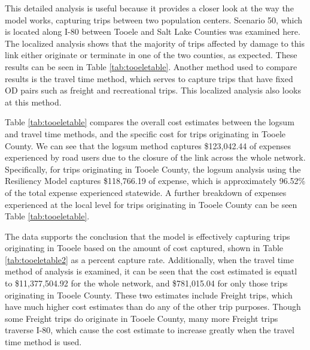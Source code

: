 This detailed analysis is useful because it
provides a closer look at the way the model works, capturing trips
between two population centers. Scenario 50, which is located along I-80 between Tooele and Salt Lake Counties
was examined here. The localized analysis shows that the majority of trips
affected by damage to this link either originate or terminate in one of the
two counties, as expected. These results can be seen in Table
\ref{tab:tooeletable}. Another method used to compare results is
the travel time method,
which serves to capture trips that have fixed OD pairs such as freight and
recreational trips. This localized analysis also looks at this method.

Table \ref{tab:tooeletable} compares the overall cost estimates between the
logsum and travel time methods, and the specific cost for trips originating in
Tooele County. We can see that the logsum
method captures \$123,042.44 of expenses experienced by road users due to the closure of the
link across the whole network. Specifically, for trips originating in Tooele County, the logsum analysis using the Resiliency
Model captures \$118,766.19 of
expense, which is approximately 96.52\% of the total expense experienced
statewide. A further breakdown of expenses experienced at the local level
for trips originating in Tooele County
can be seen Table \ref{tab:tooeletable}.

The data supports the conclusion that the model is effectively
capturing trips originating in Tooele based on the amount of cost captured,
shown in Table \ref{tab:tooeletable2} as a percent capture rate. Additionally, when the
travel time method of analysis is examined, it can be seen that the cost estimated
is equatl to \$11,377,504.92 for the whole network, and \$781,015.04 for only
those trips originating in Tooele County. These two estimates include Freight
trips, which have much higher cost estimates than do any of the other trip purposes.
Though some Freight trips do originate in Tooele County, many more Freight trips traverse
I-80, which cause the cost estimate to increase greatly when the travel time method
is used.

